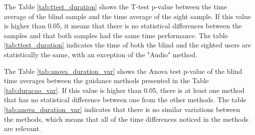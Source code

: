 %

The Table \ref{tab:ttest_duration} shows the T-test p-value between the time average of the blind sample and the time average of the sight sample. If this value is higher than 0.05, it means that there is no statistical differences between the samples and that both samples had the same time performance. The table \ref{tab:ttest_duration} indicates the time of both the blind and the sighted users are statistically the same, with an exception of the "Audio" method.

%

\begin{table}[!htb]
    \begin{minipage}{.45\linewidth}
        
    \end{minipage}
    \hfill
    \begin{minipage}{.45\linewidth}
        \vspace{-1.5cm}
        
    \end{minipage}
\end{table}

The Table \ref{tab:anova_duration_var} shows the Anova test p-value of the blind time averages between the guidance methods presented in the Table \ref{tab:duracao_var}. If this value is higher than 0.05, there is at least one method that has no statistical difference between one from the other methods. The table \ref{tab:anova_duration_var} indicates that there is no similar variations between the methods, which means that all of the time differences noticed in the methods are relevant.





%
%

